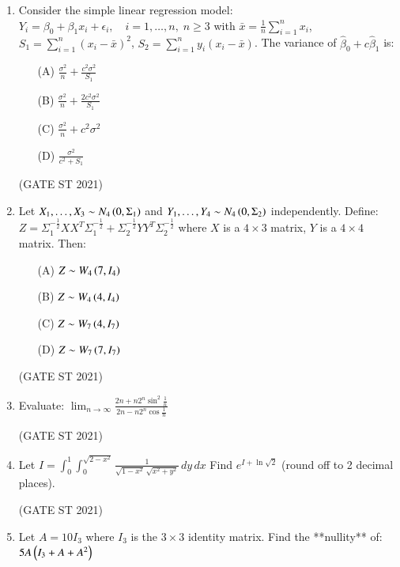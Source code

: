 \documentclass[journal,12pt,onecolumn]{IEEEtran}
\theoremstyle{remark}
\begin{document}
\begin{enumerate}
\item
Consider the simple linear regression model:
$
Y_i = \beta_0 + \beta_1 x_i + \epsilon_i, \quad i = 1, \dots, n, \; n \geq 3
$
with $\bar{x} = \frac{1}{n} \sum_{i=1}^n x_i$, $S_1 = \sum_{i=1}^n (x_i - \bar{x})^2$, $S_2 = \sum_{i=1}^n y_i(x_i - \bar{x})$.  
The variance of $\hat{\beta}_0 + c \hat{\beta}_1$ is:
\begin{enumerate}
\item[(A)] $\frac{\sigma^2}{n} + \frac{c^2\sigma^2}{S_1}$
\item[(B)] $\frac{\sigma^2}{n} + \frac{2c^2\sigma^2}{S_1}$
\item[(C)] $\frac{\sigma^2}{n} + c^2\sigma^2$
\item[(D)] $\frac{\sigma^2}{c^2 + S_1}$
\end{enumerate}
\hfill (GATE ST 2021) \\

 

\item
Let $X_1,\dots,X_3 \sim N_4\left(0,\Sigma_1\right)$ and $Y_1,\dots,Y_4 \sim N_4\left(0,\Sigma_2\right)$ independently.  
Define:
$
Z = \Sigma_1^{-\frac12}XX^T\Sigma_1^{-\frac12} + \Sigma_2^{-\frac12}YY^T\Sigma_2^{-\frac12}
$
where $X$ is a $4\times 3$ matrix, $Y$ is a $4\times 4$ matrix.  
Then:
\begin{enumerate}
\item[(A)] $Z \sim W_4\left(7, I_4\right)$
\item[(B)] $Z \sim W_4\left(4, I_4\right)$
\item[(C)] $Z \sim W_7\left(4, I_7\right)$
\item[(D)] $Z \sim W_7\left(7, I_7\right)$
\end{enumerate}
\hfill (GATE ST 2021) \\


 \item
Evaluate:
$
\lim_{n \to \infty} \frac{2n + n 2^n \sin^2\frac{1}{n}}{2n - n 2^n \cos\frac{1}{n}}
$

\hfill (GATE ST 2021) \\
\item
Let
$
I = \int_{0}^{1} \int_{0}^{\sqrt{2 - x^2}} \frac{1}{\sqrt{1 - x^2} \, \sqrt{x^2 + y^2}} \, dy \, dx
$
Find $e^{I + \ln{\sqrt{2}}}$ (round off to 2 decimal places).

\hfill (GATE ST 2021) \\

\item
Let $A = 10I_3$ where $I_3$ is the $3 \times 3$ identity matrix.  
Find the **nullity** of:
$
5A \left(I_3 + A + A^2\right)
$


\end{enumerate}
\end{document}
